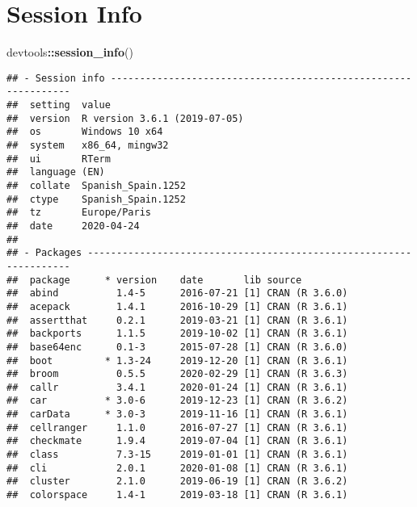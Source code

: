 \documentclass[
]{article}
\newenvironment{Shaded}{\begin{snugshade}}{\end{snugshade}}
\newcommand{\KeywordTok}[1]{\textcolor[rgb]{0.13,0.29,0.53}{\textbf{#1}}}
\newcommand{\NormalTok}[1]{#1}
\newcommand{\OperatorTok}[1]{\textcolor[rgb]{0.81,0.36,0.00}{\textbf{#1}}}
\begin{document}
\hypertarget{session-info}{%
\section{Session Info}\label{session-info}}

\begin{Shaded}
\begin{Highlighting}[]
\NormalTok{devtools}\OperatorTok{::}\KeywordTok{session_info}\NormalTok{()}
\end{Highlighting}
\end{Shaded}

\begin{verbatim}
## - Session info ---------------------------------------------------------------
##  setting  value                       
##  version  R version 3.6.1 (2019-07-05)
##  os       Windows 10 x64              
##  system   x86_64, mingw32             
##  ui       RTerm                       
##  language (EN)                        
##  collate  Spanish_Spain.1252          
##  ctype    Spanish_Spain.1252          
##  tz       Europe/Paris                
##  date     2020-04-24                  
## 
## - Packages -------------------------------------------------------------------
##  package      * version    date       lib source                            
##  abind          1.4-5      2016-07-21 [1] CRAN (R 3.6.0)                    
##  acepack        1.4.1      2016-10-29 [1] CRAN (R 3.6.1)                    
##  assertthat     0.2.1      2019-03-21 [1] CRAN (R 3.6.1)                    
##  backports      1.1.5      2019-10-02 [1] CRAN (R 3.6.1)                    
##  base64enc      0.1-3      2015-07-28 [1] CRAN (R 3.6.0)                    
##  boot         * 1.3-24     2019-12-20 [1] CRAN (R 3.6.1)                    
##  broom          0.5.5      2020-02-29 [1] CRAN (R 3.6.3)                    
##  callr          3.4.1      2020-01-24 [1] CRAN (R 3.6.1)                    
##  car          * 3.0-6      2019-12-23 [1] CRAN (R 3.6.2)                    
##  carData      * 3.0-3      2019-11-16 [1] CRAN (R 3.6.1)                    
##  cellranger     1.1.0      2016-07-27 [1] CRAN (R 3.6.1)                    
##  checkmate      1.9.4      2019-07-04 [1] CRAN (R 3.6.1)                    
##  class          7.3-15     2019-01-01 [1] CRAN (R 3.6.1)                    
##  cli            2.0.1      2020-01-08 [1] CRAN (R 3.6.1)                    
##  cluster        2.1.0      2019-06-19 [1] CRAN (R 3.6.2)                    
##  colorspace     1.4-1      2019-03-18 [1] CRAN (R 3.6.1)                    

\end{verbatim}
\end{document}
